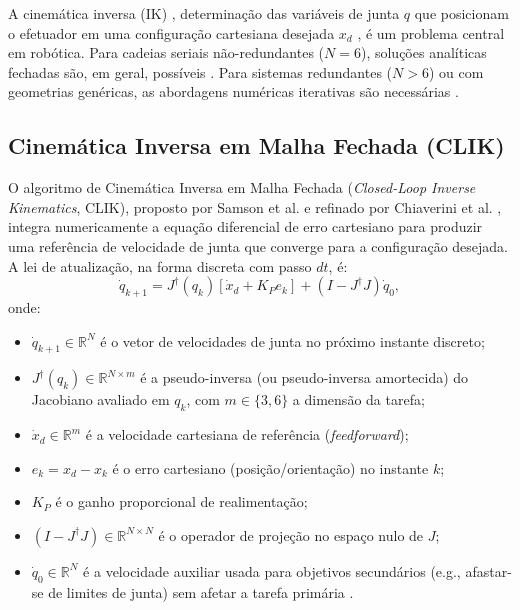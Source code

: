 A cinemática inversa (IK) , determinação das variáveis de junta $q$ que posicionam o efetuador em uma configuração cartesiana desejada $x_d$ , é um problema central em robótica. Para cadeias seriais não-redundantes ($N = 6$), soluções analíticas fechadas são, em geral, possíveis \cite{craig1989introduction}. Para sistemas redundantes ($N > 6$) ou com geometrias genéricas, as abordagens numéricas iterativas são necessárias \cite{siciliano2009robotics}.

\subsection{Cinemática Inversa em Malha Fechada (CLIK)}

O algoritmo de Cinemática Inversa em Malha Fechada (\textit{Closed-Loop Inverse Kinematics}, CLIK), proposto por Samson et al. \cite{samson1991robot} e refinado por Chiaverini et al. \cite{chiaverini1994review}, integra numericamente a equação diferencial de erro cartesiano para produzir uma referência de velocidade de junta que converge para a configuração desejada. A lei de atualização, na forma discreta com passo $dt$, é:
\begin{equation}
    \dot{q}_{k+1} = J^{\dagger}(q_k)\left[\dot{x}_d + K_P e_k\right] + \left(I - J^{\dagger}J\right)\dot{q}_0,
    \label{eq:clik}
\end{equation}
onde:
\begin{itemize}
    \item $\dot{q}_{k+1} \in \mathbb{R}^{N}$ é o vetor de velocidades de junta no próximo instante discreto;
    \item $J^{\dagger}(q_k) \in \mathbb{R}^{N\times m}$ é a pseudo-inversa (ou pseudo-inversa amortecida) do Jacobiano avaliado em $q_k$, com $m \in \{3, 6\}$ a dimensão da tarefa;
    \item $\dot{x}_d \in \mathbb{R}^{m}$ é a velocidade cartesiana de referência (\textit{feedforward});
    \item $e_k = x_d - x_k$ é o erro cartesiano (posição/orientação) no instante $k$;
    \item $K_P$ é o ganho proporcional de realimentação;
    \item $(I - J^{\dagger}J) \in \mathbb{R}^{N\times N}$ é o operador de projeção no espaço nulo de $J$;
    \item $\dot{q}_0 \in \mathbb{R}^{N}$ é a velocidade auxiliar usada para objetivos secundários (e.g., afastar-se de limites de junta) sem afetar a tarefa primária \cite{chiaverini1997singularity}.
\end{itemize}

